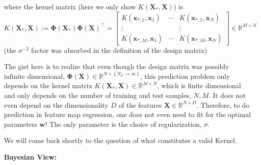 \documentclass[11pt]{article}
\theoremstyle{plain} %
\theoremstyle{remark}
\begin{document}
where the kernel matrix (here we only show $K\left(\mathbf{X}_{*}, \mathbf{X}\right)$) is
$$
  K\left(\mathbf{X}_{*}, \mathbf{X}\right) :=\boldsymbol{\Phi}\left(\mathbf{X}_{*}\right) \boldsymbol{\Phi}(\mathbf{X})^\top
  =\left[\begin{array}{ccc}
      K\left(\mathbf{x}_{*, 1}, \mathbf{x}_{1}\right) & \cdots & K\left(\mathbf{x}_{*, 1}, \mathbf{x}_{N}\right) \\
      \vdots                                          &        & \vdots                                          \\
      K\left(\mathbf{x}_{*, M}, \mathbf{x}_{1}\right) & \cdots & K\left(\mathbf{x}_{*, M}, \mathbf{x}_{N}\right)
    \end{array}\right] \in \mathbb{R}^{M \times N}
$$
(the $\sigma^{-2}$ factor was absorbed in the definition of the design
matrix)

The gist here is to realize that even though the design matrix was possibly
infinite dimensional, $\mathbf{\Phi}(\mathbf{X}) \in \mathbb{R}^{N
  \times\left\{N_{F} \rightarrow \infty\right\}}$, this prediction problem only
depends on the kernel matrix $K\left(\mathbf{X}_{*}, \mathbf{X}\right) \in
  \mathbb{R}^{M \times N}$, which is finite dimensional and only depends on the
number of training and test samples, $N, M$. It does not even depend on the
dimensionality $D$ of the features $\mathbf{X} \in \mathbb{R}^{N \times D}$.
Therefore, to do prediction in feature map regression, one does not even need to
fit for the optimal parameters $\mathbf{w}$! The only parameter is the choice of
regularization, $\sigma$.

We will come back shortly to the question of what constitutes a valid Kernel.

\textbf{Bayesian View:}
\end{document}
